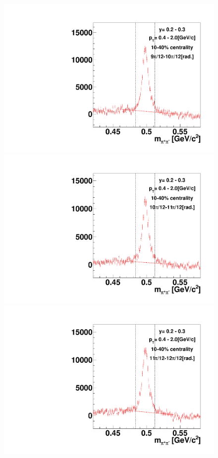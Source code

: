 \begin{figure}[h]
\includegraphics[width=0.14\linewidth]{chapterX/fig/ks_v1_sig/kf_ptslice0_cent1_ks_flow_phi10_rap2.pdf}
\includegraphics[width=0.14\linewidth]{chapterX/fig/ks_v1_sig/kf_ptslice0_cent1_ks_flow_phi11_rap2.pdf}
\includegraphics[width=0.14\linewidth]{chapterX/fig/ks_v1_sig/kf_ptslice0_cent1_ks_flow_phi12_rap2.pdf}


\end{figure}
